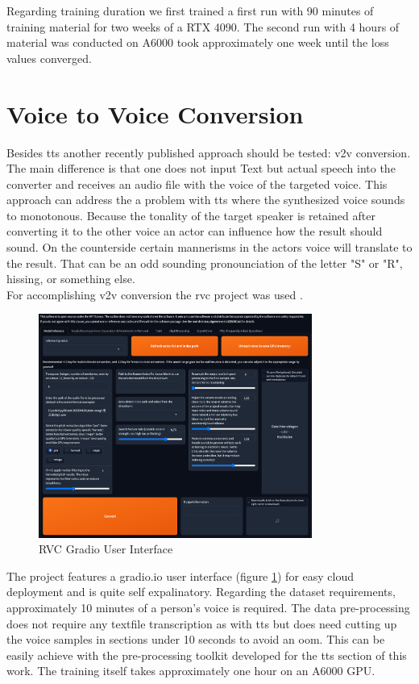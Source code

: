 \documentclass[
  a4paper,  %
  twoside,  %
  bibliography=totoc,
  headsepline,
  cleardoublepage=empty,
  parskip=half,
  draft=false
]{scrbook}
\begin{document}
Regarding training duration we first trained a first run with 90 minutes of training material for two weeks of a RTX 4090. The second run with 4 hours of material was conducted on A6000 took approximately one week until the loss values converged.

\section{Voice to Voice Conversion}
\label{sec:v2v}
Besides \gls{tts} another recently published approach should be tested: \gls{v2v} conversion. The main difference is that one does not input Text but actual speech into the converter and receives an audio file with the voice of the targeted voice. This approach can address the a problem with \gls{tts} where the synthesized voice sounds to monotonous. Because the tonality of the target speaker is retained after converting it to the other voice an actor can influence how the result should sound. On the counterside certain mannerisms in the actors voice will translate to the result. That can be an odd sounding pronounciation of the letter "S" or "R", hissing, or something else. \\
For accomplishing \gls{v2v} conversion the \gls{rvc} project was used \cite{RVCProjectRetrievalbasedVoiceConversionWebUI2023}. 
\begin{figure}[h]
  \centering
  \includegraphics[width=0.8\textwidth]{./graphics/images/RVC-UI.png}
  \caption{RVC Gradio User Interface}
  \label{fig:rvc-gradio}
\end{figure}
The project features a gradio.io user interface (figure \ref{fig:rvc-gradio}) for easy cloud deployment and is quite self expalinatory. Regarding the dataset requirements, approximately 10 minutes of a person's voice is required. The data pre-processing does not require any textfile transcription as with \gls{tts} but does need cutting up the voice samples in sections under 10 seconds to avoid an \gls{oom}. This can be easily achieve with the pre-processing toolkit developed for the \gls{tts} section of this work. The training itself takes approximately one hour on an A6000 GPU. \\
\end{document}
